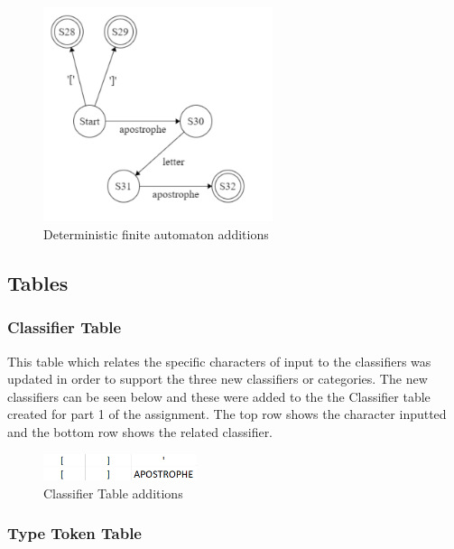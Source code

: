\documentclass{article}
\begin{document}
				\begin{center}
					\begin{figure}[H]
			 			\includegraphics[width=0.6\textwidth]{part2automaton.jpeg}
			 			\centering
			  			\caption{Deterministic finite automaton additions}
			  			\label{fig:automaton}
					\end{figure}
				\end{center}
				

			\subsection{Tables}
			\subsubsection{Classifier Table}
			
			This table which relates the specific characters of input to the classifiers was updated in order to support the three new classifiers or categories. The new classifiers can be seen below and these were added to the the Classifier table created for part 1 of the assignment. The top row shows the character inputted and the bottom row shows the related classifier.
			
			 \begin{center}
					\begin{figure}[H]
			 			\includegraphics[width=0.4\textwidth]{ctpart2.png}
			 			\centering
			  			\caption{Classifier Table additions}
			  			\label{fig:cttable}
					\end{figure}
				\end{center}
				
				\subsubsection{Type Token Table}
			
\end{document}

